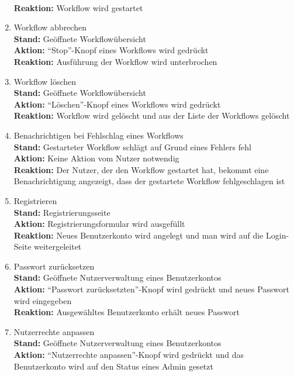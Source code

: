 \begin{enumerate}
        \\ \textbf{Reaktion:} Workflow wird gestartet
    \item Workflow abbrechen
        \\ \textbf{Stand:} Geöffnete Workflowübersicht
        \\ \textbf{Aktion:} \enquote{Stop}-Knopf eines Workflows wird gedrückt
        \\ \textbf{Reaktion:} Ausführung der \gls{Workflow} wird unterbrochen
    \item Workflow löschen
        \\ \textbf{Stand:} Geöffnete Workflowübersicht
        \\ \textbf{Aktion:} \enquote{Löschen}-Knopf eines Workflows wird gedrückt
        \\ \textbf{Reaktion:} Workflow wird gelöscht und aus der Liste der Workflows gelöscht
    \item Benachrichtigen bei Fehlschlag eines Workflows
        \\ \textbf{Stand:} Gestarteter Workflow schlägt auf Grund eines Fehlers fehl
        \\ \textbf{Aktion:} Keine Aktion vom \gls{Nutzer} notwendig
        \\ \textbf{Reaktion:} Der \gls{Nutzer}, der den Workflow gestartet hat, bekommt eine Benachrichtigung angezeigt, dass der gestartete Workflow fehlgeschlagen ist
    \item Registrieren
        \\ \textbf{Stand:} Registrierungsseite
        \\ \textbf{Aktion:} Registrierungsformular wird ausgefüllt
        \\ \textbf{Reaktion:} Neues Benutzerkonto wird angelegt und man wird auf die Login-Seite weitergeleitet
    \item Passwort zurücksetzen
        \\ \textbf{Stand:} Geöffnete Nutzerverwaltung eines Benutzerkontos
        \\ \textbf{Aktion:} \enquote{Passwort zurücksetzten}-Knopf wird gedrückt und neues Passwort wird eingegeben
        \\ \textbf{Reaktion:} Ausgewähltes Benutzerkonto erhält neues Passwort
    \item Nutzerrechte anpassen
        \\ \textbf{Stand:} Geöffnete Nutzerverwaltung eines Benutzerkontos
        \\ \textbf{Aktion:} \enquote{Nutzerrechte anpassen}-Knopf wird gedrückt und das Benutzerkonto wird auf den Status eines \Gls{Admin} gesetzt

\end{enumerate}
